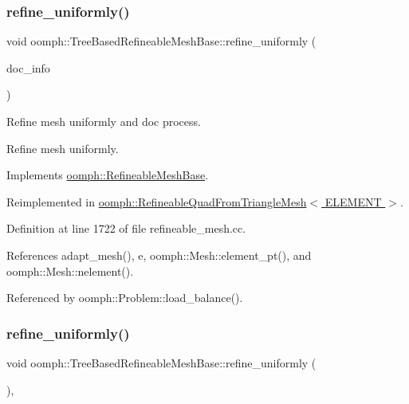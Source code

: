 \subsubsection{\texorpdfstring{refine\+\_\+uniformly()}{refine\_uniformly()}\hspace{0.1cm}{\footnotesize\ttfamily [1/2]}}
{\footnotesize\ttfamily void oomph\+::\+Tree\+Based\+Refineable\+Mesh\+Base\+::refine\+\_\+uniformly (\begin{DoxyParamCaption}\item[{\hyperlink{classoomph_1_1DocInfo}{Doc\+Info} \&}]{doc\+\_\+info }\end{DoxyParamCaption})\hspace{0.3cm}{\ttfamily [virtual]}}



Refine mesh uniformly and doc process. 

Refine mesh uniformly. 

Implements \hyperlink{classoomph_1_1RefineableMeshBase_afe5810e718ce1939f3f81e3eb5743768}{oomph\+::\+Refineable\+Mesh\+Base}.



Reimplemented in \hyperlink{classoomph_1_1RefineableQuadFromTriangleMesh_ab78f50c13f9ccf7d1f359bc443fe2a9d}{oomph\+::\+Refineable\+Quad\+From\+Triangle\+Mesh$<$ E\+L\+E\+M\+E\+N\+T $>$}.



Definition at line 1722 of file refineable\+\_\+mesh.\+cc.



References adapt\+\_\+mesh(), e, oomph\+::\+Mesh\+::element\+\_\+pt(), and oomph\+::\+Mesh\+::nelement().



Referenced by oomph\+::\+Problem\+::load\+\_\+balance().

\mbox{\label{classoomph_1_1TreeBasedRefineableMeshBase_a8e67b50fecb03fe1ac93dcb81e4ac6e9}} 
\subsubsection{\texorpdfstring{refine\+\_\+uniformly()}{refine\_uniformly()}\hspace{0.1cm}{\footnotesize\ttfamily [2/2]}}
{\footnotesize\ttfamily void oomph\+::\+Tree\+Based\+Refineable\+Mesh\+Base\+::refine\+\_\+uniformly (\begin{DoxyParamCaption}{ }\end{DoxyParamCaption})\hspace{0.3cm}{\ttfamily [inline]}, {\ttfamily [virtual]}}



